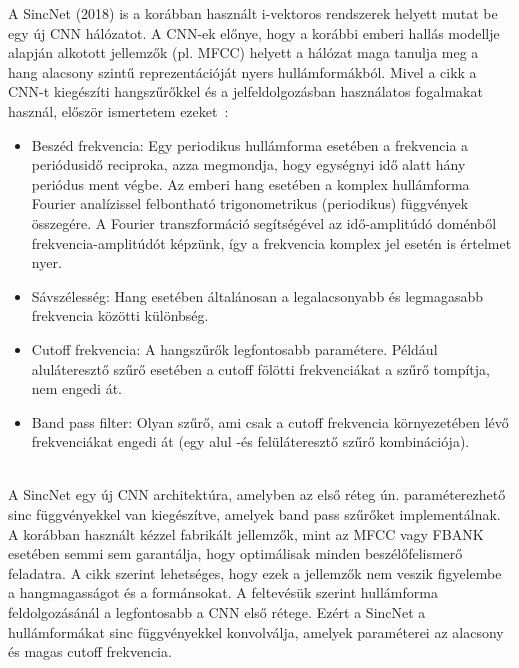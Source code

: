 A SincNet (2018) is a korábban használt i-vektoros rendszerek helyett mutat be egy új CNN hálózatot. A CNN-ek előnye, hogy a korábbi emberi hallás modellje alapján alkotott jellemzők (pl. MFCC) helyett a hálózat maga tanulja meg a hang alacsony szintű reprezentációját nyers hullámformákból. Mivel a cikk a CNN-t kiegészíti hangszűrőkkel és a jelfeldolgozásban használatos fogalmakat használ, először ismertetem ezeket~\cite{sincnet}:
\begin{itemize}
	\item Beszéd frekvencia: Egy periodikus hullámforma esetében a frekvencia a periódusidő reciproka, azza megmondja, hogy egységnyi idő alatt hány periódus ment végbe. Az emberi hang esetében a komplex hullámforma Fourier analízissel felbontható trigonometrikus (periodikus) függvények összegére. A Fourier transzformáció segítségével az idő-amplitúdó doménből frekvencia-amplitúdót képzünk, így a frekvencia komplex jel esetén is értelmet nyer.
	\item Sávszélesség: Hang esetében általánosan a legalacsonyabb és legmagasabb frekvencia közötti különbség.
	\item Cutoff frekvencia: A hangszűrők legfontosabb paramétere. Például aluláteresztő szűrő esetében a cutoff fölötti frekvenciákat a szűrő tompítja, nem engedi át.
	\item Band pass filter: Olyan szűrő, ami csak a cutoff frekvencia környezetében lévő frekvenciákat engedi át (egy alul -és felüláteresztő szűrő kombinációja).
\end{itemize} 
\ \\
\newline
A SincNet egy új CNN architektúra, amelyben az első réteg ún. paraméterezhető sinc függvényekkel van kiegészítve, amelyek band pass szűrőket implementálnak.
\newline
\newline
A korábban használt kézzel fabrikált jellemzők, mint az MFCC vagy FBANK esetében semmi sem garantálja, hogy optimálisak minden beszélőfelismerő feladatra. A cikk szerint lehetséges, hogy ezek a jellemzők nem veszik figyelembe a hangmagasságot és a formánsokat. A feltevésük szerint hullámforma feldolgozásánál a legfontosabb a CNN első rétege. Ezért a SincNet a hullámformákat sinc függvényekkel konvolválja, amelyek paraméterei az alacsony és magas cutoff frekvencia.

